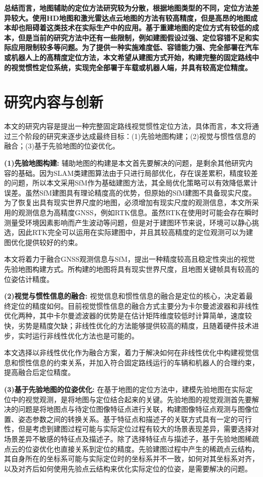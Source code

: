 \textbf{总结而言，地图辅助的定位方法研究较为分散，根据地图类型的不同，定位方法差异较大。使用HD地图和激光雷达点云地图的方法有较高精度，但是高昂的地图成本却也阻碍着这类技术在实际生产中的应用。基于重建地图的定位方式有较低的成本，但是当前的研究方法中还有一些限制，例如建图假设过强、定位容错不足和实际应用限制较多等问题。为了提供一种实施难度低、容错能力强、完全部署在汽车或机器人上的高精度定位方法，本文希望从建图方式开始，构建完整的固定路线中的视觉惯性定位系统，实现完全部署于车载或机器人端，并具有较高定位精度。}


\section{研究内容与创新}

本文的研究内容是提出一种完整固定路线视觉惯性定位方法，具体而言，本文将通过三个阶段的研究来逐步达成最终目标：(1)先验地图构建；(2)视觉与惯性信息的融合；(3)基于先验地图的位姿优化。


\textbf{(1)先验地图构建:}
辅助地图的构建是本文首先要解决的问题，是剩余其他研究内容的基础。因为SLAM类建图算法由于只进行局部优化，存在误差累积，精度较差的问题，所以本文采用SfM作为基础建图方法，其全局优化策略可以有效降低累计误差。虽然SfM建图具有理论精度高的优势，但原始的SfM建图不具备现实尺度。为了恢复出具有现实世界尺度的地图，必须增加有现实尺度的观测信息，本文所采用的观测信息为高精度GNSS，例如RTK信息。虽然RTK在使用时可能会存在瞬时测量受环境因素影响而产生波动等问题，但是对于建图环节来说，环境可以静心挑选，因此RTK完全可以运用在实际建图中，并且其较高精度的定位观测可以为建图优化提供较好的约束。

本文将着力于融合GNSS观测信息与SfM，提出一种精度较高且稳定性突出的视觉先验地图构建方式。所构建的地图将具有现实世界尺度，且地图关键帧具有较高的位姿估计精度。

\textbf{(2)视觉与惯性信息的融合:}
视觉信息和惯性信息的融合是定位的核心，决定着最终定位的精度如何。目前视觉惯性信息的融合方式主要分为卡尔曼滤波器和非线性优化两种，其中卡尔曼滤波器的优势是在估计矩阵维度较低时计算简单，速度较快，劣势是精度欠缺；非线性优化的方法能够提供较高的精度，且随着硬件技术进步，实时运行非线性优化方法也是可能的。

本文选择以非线性优化作为融合方案，着力于解决如何在非线性优化中构建视觉信息和惯性信息的约束关系，并加入符合固定路线运行的车辆和机器人的合理约束，提高融合后定位精度。

\textbf{(3)基于先验地图的位姿优化:}
在基于地图的定位方法中，建模先验地图在实际定位中的视觉观测，是将地图与定位结合起来的关键。先验地图的视觉观测首先要解决的问题是将地图点与待定位图像特征点进行关联，构建图像特征点观测与图像位置、姿态参数之间的转换关系。基于特征点和描述子的关联方式具有一定的可行性，但是考虑到建图过程可能与实际定位过程有较大的场景表现差异，需要选择对场景差异不敏感的特征点及描述子。除了选择特征点与描述子，基于先验地图稀疏点云的位姿优化也直接关系到定位的精度。先验建图过程中产生的稀疏点云结构，其自身所在的坐标系可能与实际定位时的坐标系并不一致，如何对其坐标系对齐，以及对齐后如何使用先验点云结构来优化实际定位的位姿，是需要解决的问题。

